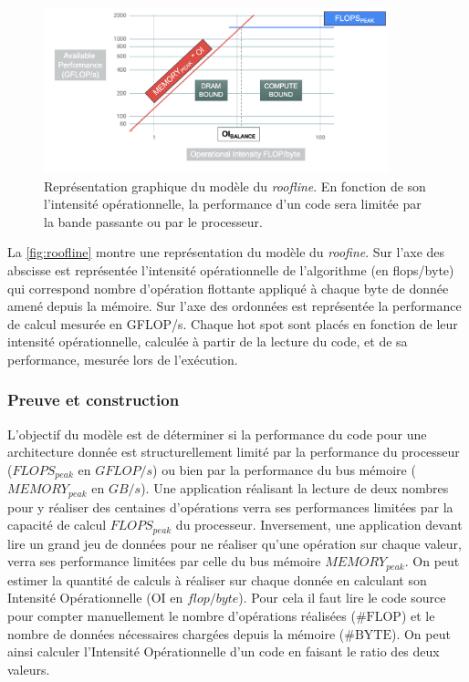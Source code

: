 \begin{figure}
    \center
    \includegraphics[width=10cm]{images/roofline.png}
    \caption{\label{fig:roofline} Représentation graphique du modèle du \textit{roofline}. En fonction de son l'intensité opérationnelle, la performance d'un code sera limitée par la bande passante ou par le processeur.}
\end{figure}


La \autoref{fig:roofline} montre une représentation du modèle du \textit{roofine}. Sur l’axe des abscisse est représentée l’intensité opérationnelle de l’algorithme (en flops/byte) qui correspond nombre d’opération flottante appliqué à chaque byte de donnée amené depuis la mémoire. Sur l’axe des ordonnées est représentée la performance de calcul mesurée en GFLOP/s.
Chaque hot spot sont placés en fonction de leur intensité opérationnelle, calculée à partir de la lecture du code, et de sa performance, mesurée lors de l’exécution.

\subsubsection{Preuve et construction}

L’objectif du modèle est de déterminer si la performance du code pour une architecture donnée est structurellement limité par la performance du processeur ($FLOPS_{peak}$ en $GFLOP/s$) ou bien par la performance du bus mémoire ($MEMORY_{peak}$ en $GB/s$). Une application réalisant la lecture de deux nombres pour y réaliser des centaines d’opérations verra ses performances limitées par la capacité de calcul $FLOPS_{peak}$ du processeur. Inversement, une application devant lire un grand jeu de données pour ne réaliser qu'une opération sur chaque valeur, verra ses performance limitées par celle du bus mémoire $MEMORY_{peak}$. On peut estimer la quantité de calculs à réaliser sur chaque donnée en calculant son Intensité Opérationnelle  ($\text{OI}$ en $flop/byte$). Pour cela il faut lire le code source pour compter manuellement le nombre d’opérations réalisées ($\text{\#FLOP}$) et le nombre de données nécessaires chargées depuis la mémoire ($\text{\#BYTE}$). On peut ainsi calculer l’Intensité Opérationnelle d’un code en faisant le ratio des deux valeurs.

